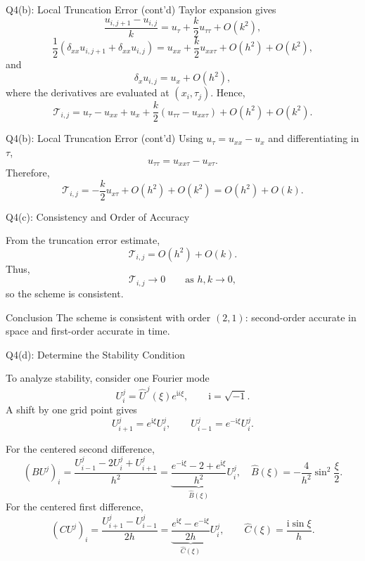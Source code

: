 \documentclass{beamer}
\begin{document}
\begin{frame}{Q4(b): Local Truncation Error (cont'd)}
Taylor expansion gives
\[
\frac{u_{i,j+1}-u_{i,j}}{k}
=
u_\tau+\frac{k}{2}u_{\tau\tau}+O(k^2),
\]
\[
\frac12\left(\delta_{xx}u_{i,j+1}+\delta_{xx}u_{i,j}\right)
=
u_{xx}+\frac{k}{2}u_{xx\tau}+O(h^2)+O(k^2),
\]
and
\[
\delta_xu_{i,j}=u_x+O(h^2),
\]
where the derivatives are evaluated at $(x_i,\tau_j)$. Hence,
\[
\mathcal{T}_{i,j}
=
u_\tau-u_{xx}+u_x
+\frac{k}{2}\left(u_{\tau\tau}-u_{xx\tau}\right)
+O(h^2)+O(k^2).
\]
\end{frame}

\begin{frame}{Q4(b): Local Truncation Error (cont'd)}
Using $u_\tau=u_{xx}-u_x$ and differentiating in $\tau$,
\[
u_{\tau\tau}=u_{xx\tau}-u_{x\tau}.
\]
Therefore,
\[
\mathcal{T}_{i,j}
=
-\frac{k}{2}u_{x\tau}+O(h^2)+O(k^2)
=
O(h^2)+O(k).
\]
\end{frame}


\begin{frame}{Q4(c): Consistency and Order of Accuracy}

From the truncation error estimate,
\[
\mathcal{T}_{i,j}=O(h^2)+O(k).
\]
Thus,
\[
\mathcal{T}_{i,j}\longrightarrow 0
\qquad\text{as }h,k\longrightarrow0,
\]
so the scheme is consistent.
\begin{block}{Conclusion}
The scheme is consistent with order $(2,1)$: second-order accurate
in space and first-order accurate in time.
\end{block}

\end{frame}


\begin{frame}{Q4(d): Determine the Stability Condition}

To analyze stability, consider one Fourier mode
\[
U_i^j=\widehat U^{\,j}(\xi)e^{\mathrm{i}i\xi},
\qquad \mathrm{i}=\sqrt{-1}.
\]
A shift by one grid point gives
\[
U_{i+1}^j=e^{\mathrm{i}\xi}U_i^j,
\qquad
U_{i-1}^j=e^{-\mathrm{i}\xi}U_i^j.
\]

For the centered second difference,
\[
(BU^j)_i
=
\frac{U_{i-1}^j-2U_i^j+U_{i+1}^j}{h^2}
=
\underbrace{\frac{e^{-\mathrm{i}\xi}-2+e^{\mathrm{i}\xi}}{h^2}}_{\widehat B(\xi)}
U_i^j, \quad \widehat B(\xi)=-\frac{4}{h^2}\sin^2\frac{\xi}{2}.
\]
For the centered first difference,
\[
(CU^j)_i
=
\frac{U_{i+1}^j-U_{i-1}^j}{2h}
=
\underbrace{\frac{e^{\mathrm{i}\xi}-e^{-\mathrm{i}\xi}}{2h}}_{\widehat C(\xi)}
U_i^j,
\qquad
\widehat C(\xi)=\frac{\mathrm{i}\sin\xi}{h}.
\]

\end{frame}
\end{document}
